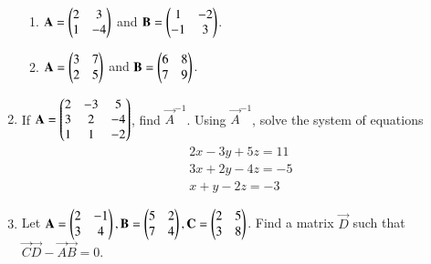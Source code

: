 \begin{enumerate}[label=\thesubsection.\arabic*,ref=\thesubsection.\theenumi]
	\begin{enumerate}
\item $\mathbf{A}=\begin{pmatrix}2&3 \\1&-4\end{pmatrix}$ and $\mathbf{B}=\begin{pmatrix}1&-2 \\-1&3\end{pmatrix}$.
\item $\mathbf{A}=\begin{pmatrix}3 & 7 \\ 2 & 5\end{pmatrix}$ and $\mathbf{B}=\begin{pmatrix}6 & 8 \\ 7 & 9\end{pmatrix}$. 
\end{enumerate}
\item If $\mathbf{A}=\begin{pmatrix}2&-3&5\\ 3&2&-4\\ 1&1&-2\end{pmatrix}$, find $\vec{A}^{-1}$.  Using $\vec{A}^{-1}$, solve the system of equations
\begin{align}
 2x-3y+5z =  11\\
 3x+2y-4z = -5\\
 x+y-2z = -3
\end{align}
\item Let $\mathbf{A}=\begin{pmatrix}2&-1\\3&4\end{pmatrix}, \mathbf{B}=\begin{pmatrix}5&2\\7&4\end{pmatrix}, \mathbf{C}=\begin{pmatrix}2&5\\3&8\end{pmatrix}$.  Find a matrix $\vec{D}$ such that $\vec{C}\vec{D}-\vec{A}\vec{B}=0$. 
\end{enumerate}
